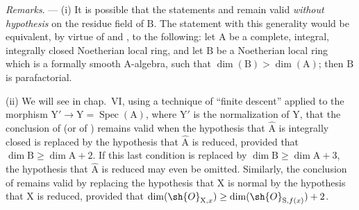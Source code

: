 \begin{env}[21.14.4]
\label{IV.21.14.4}
\emph{Remarks}. ---
(i) It is possible that the statements  and  remain valid \emph{without hypothesis} on the residue field of $\mathrm{B}$.
The statement with this generality would be equivalent, by virtue of  and , to the following: let $\mathrm{A}$ be a complete, integral, integrally closed Noetherian local ring, and let $\mathrm{B}$ be a Noetherian local ring which is a formally smooth $\mathrm{A}$-algebra, such that $\dim(\mathrm{B})>\dim(\mathrm{A})$; then $\mathrm{B}$ is parafactorial.

(ii) We will see in chap.~VI, using a technique of ``finite descent'' applied to the morphism $\mathrm{Y}'\to\mathrm{Y}=\operatorname{Spec}(\mathrm{A})$, where $\mathrm{Y}'$ is the normalization of $\mathrm{Y}$, that the conclusion of  (or of ) remains valid when the hypothesis that $\widehat{\mathrm{A}}$ is integrally closed is replaced by the hypothesis that $\widehat{\mathrm{A}}$ is reduced, provided that $\dim\mathrm{B}\geq\dim\mathrm{A}+2$.
If this last condition is replaced by $\dim\mathrm{B}\geq\dim\mathrm{A}+3$, the hypothesis that $\widehat{\mathrm{A}}$ is reduced may even be omitted.
Similarly, the conclusion of  remains valid by replacing the hypothesis that $\mathrm{X}$ is normal by the hypothesis that $\mathrm{X}$ is reduced, provided that $\dim(\sh{O}_{\mathrm{X},x})\geq\dim(\sh{O}_{\mathrm{S},f(x)})+2$.


\end{env}

